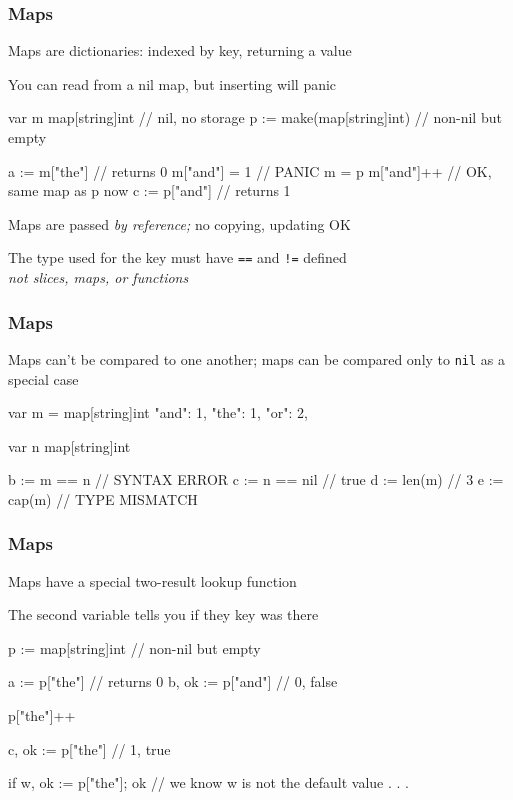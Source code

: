 \documentclass[handout,compress,t,11pt]{beamer}
\begin{document}
\begin{frame}[fragile]
    \frametitle{Maps}
    Maps are dictionaries: indexed by key, returning a value \par
    \vspace{0.3\baselineskip}
    You can read from a nil map, but inserting will panic 
\begin{golang}
    var m map[string]int        // nil, no storage
    p := make(map[string]int)   // non-nil but empty

    a := m["the"]               // returns 0
    m["and"] = 1                // PANIC
    m = p
    m["and"]++                  // OK, same map as p now
    c := p["and"]               // returns 1
\end{golang}
    \vspace{\baselineskip}
    Maps are passed {\em by reference;} no copying, updating OK \par
    \vspace{0.3\baselineskip}
    The type used for the key must have \verb|==| and \verb|!=| defined \\
    {\em not slices, maps, or functions} \par
\end{frame}

\begin{frame}[fragile]
    \frametitle{Maps}
    Maps can't be compared to one another; maps can be compared only to
     \verb|nil| as a special case
\begin{golang}
    var m  = map[string]int{
        "and": 1,
        "the": 1,
        "or":  2,
    }

    var n map[string]int
    
    b := m == n                 // SYNTAX ERROR
    c := n == nil               // true
    d := len(m)                 // 3
    e := cap(m)                 // TYPE MISMATCH
\end{golang}
    \vspace{0.5\baselineskip}
\end{frame}

\begin{frame}[fragile]
    \frametitle{Maps}
    Maps have a special two-result lookup function \par
    \vspace{0.3\baselineskip}
    The second variable tells you if they key was there
    \vspace{0.3\baselineskip}
\begin{golang}
    p := map[string]int{}       // non-nil but empty

    a := p["the"]               // returns 0
    b, ok := p["and"]           // 0, false

    p["the"]++

    c, ok := p["the"]           // 1, true

    if w, ok := p["the"]; ok {
        // we know w is not the default value
        . . .
    }
\end{golang}
\end{frame}
\end{document}
